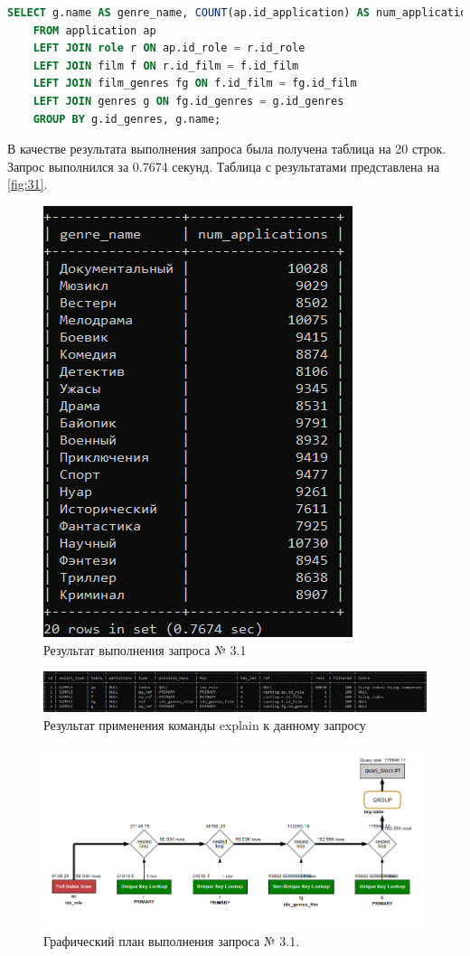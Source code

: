 \documentclass[11pt,a4paper,final]{article} %
\begin{document}
\begin{lstlisting}[caption=SQL запрос № 3.1, language=SQL]
	SELECT g.name AS genre_name, COUNT(ap.id_application) AS num_applications
	FROM application ap
	LEFT JOIN role r ON ap.id_role = r.id_role
	LEFT JOIN film f ON r.id_film = f.id_film
	LEFT JOIN film_genres fg ON f.id_film = fg.id_film
	LEFT JOIN genres g ON fg.id_genres = g.id_genres
	GROUP BY g.id_genres, g.name;
\end{lstlisting}

\par В качестве результата выполнения запроса была получена таблица на 20 строк. Запрос выполнился за 0.7674 секунд. Таблица с результатами представлена на \autoref{fig:31}.

\begin{figure}[H]
	\centering
	\includegraphics[width=0.5\linewidth]{31.png}
	\caption{Результат выполнения запроса № 3.1}
	\label{fig:31}
\end{figure}

\begin{figure}[H]
	\centering
	\includegraphics[width=1.0\linewidth]{e31.png}
	\caption{Результат применения команды explain к данному запросу}
	\label{fig:e31}
\end{figure}

\begin{figure}[H]
	\centering
	\includegraphics[width=1.0\linewidth]{ex31.png}
	\caption{Графический план выполнения запроса № 3.1.}
	\label{fig:ex31}
\end{figure}
\end{document}

